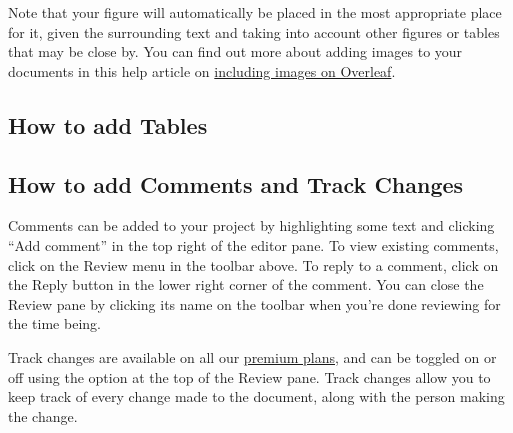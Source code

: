 \documentclass{article}
\begin{document}
Note that your figure will automatically be placed in the most appropriate place for it, given the surrounding text and taking into account other figures or tables that may be close by. You can find out more about adding images to your documents in this help article on \href{https://www.overleaf.com/learn/how-to/Including_images_on_Overleaf}{including images on Overleaf}.





\subsection{How to add Tables}



\subsection{How to add Comments and Track Changes}

Comments can be added to your project by highlighting some text and clicking ``Add comment'' in the top right of the editor pane. To view existing comments, click on the Review menu in the toolbar above. To reply to a comment, click on the Reply button in the lower right corner of the comment. You can close the Review pane by clicking its name on the toolbar when you're done reviewing for the time being.

Track changes are available on all our \href{https://www.overleaf.com/user/subscription/plans}{premium plans}, and can be toggled on or off using the option at the top of the Review pane. Track changes allow you to keep track of every change made to the document, along with the person making the change. 
\end{document}
